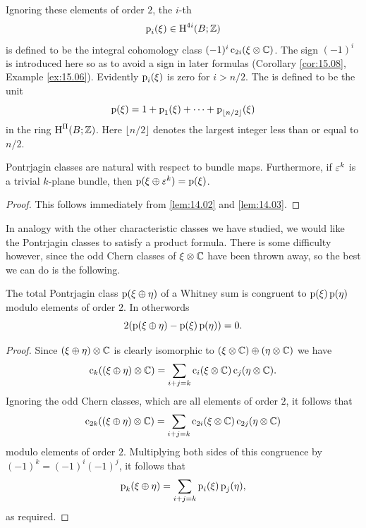 \documentclass[../main]{subfiles}
\begin{document}
\begin{definition}
Ignoring these elements of order $2$, the $i$-th  \[\operatorname{p}_i(\xi) \in \operatorname{H}^{4i}(B;\mathbb{Z})\] is defined to be the integral cohomology class $(-1)^i \operatorname{c}_{2i}(\xi \otimes \mathbb C)$. The sign $(-1)^i$ is introduced here so as to avoid a sign in later formulas (Corollary \ref{cor:15.08}, Example \ref{ex:15.06}). Evidently $\operatorname{p}_i(\xi)$ is zero for $i > n/2$. The  is defined to be the unit
\[\operatorname{p}(\xi) = 1 + \operatorname{p}_1(\xi) + \cdots + \operatorname{p}_{\lfloor n/2\rfloor}(\xi)\] in the ring $\operatorname{H}^\Pi(B;\mathbb{Z})$. Here $\lfloor n/2\rfloor$ denotes the largest integer less than or equal to $n/2$.
\end{definition}

\begin{lemma}
\label{lem:15.02}
Pontrjagin classes are natural with respect to bundle maps. Furthermore, if $\varepsilon^k$ is a trivial $k$-plane bundle, then $\operatorname{p}(\xi \oplus \varepsilon^k) = \operatorname{p}(\xi)$.
\end{lemma}
\begin{proof}
This follows immediately from \ref{lem:14.02} and \ref{lem:14.03}.
\end{proof}

In analogy with the other characteristic classes we have studied, we would like the Pontrjagin classes to satisfy a product formula. There is some difficulty however, since the odd Chern classes of $\xi \otimes \mathbb C$ have been thrown away, so the best we can do is the following.

\begin{theorem}
\label{thm:15.03}
The total Pontrjagin class $\operatorname{p}(\xi \oplus \eta)$ of a Whitney sum is congruent to $\operatorname{p}(\xi)\operatorname{p}(\eta)$ modulo elements of order $2$. In otherwords \[2(\operatorname{p}(\xi \oplus \eta) - \operatorname{p}(\xi)\operatorname{p}(\eta)) = 0.\]
\end{theorem}
\begin{proof}
Since $(\xi \oplus \eta)\otimes \mathbb C$ is clearly isomorphic to $(\xi \otimes \mathbb C) \oplus (\eta \otimes \mathbb C)$ we have \[\operatorname{c}_k((\xi \oplus \eta)\otimes \mathbb C) = \sum_{i+j=k} \operatorname{c}_i(\xi \otimes \mathbb C) \operatorname{c}_j(\eta \otimes \mathbb C).\] Ignoring the odd Chern classes, which are all elements of order $2$, it follows that \[\operatorname{c}_{2k}((\xi \oplus \eta)\otimes \mathbb C) = \sum_{i+j=k} \operatorname{c}_{2i}(\xi \otimes \mathbb C) \operatorname{c}_{2j}(\eta \otimes \mathbb C)\] modulo elements of order $2$. Multiplying both sides of this congruence by \newline $(-1)^k = (-1)^i(-1)^j$, it follows that \[\operatorname{p}_k(\xi \oplus \eta) = \sum_{i+j = k} \operatorname{p}_i(\xi)\operatorname{p}_j(\eta),\] as required.
\end{proof}
\end{document}
